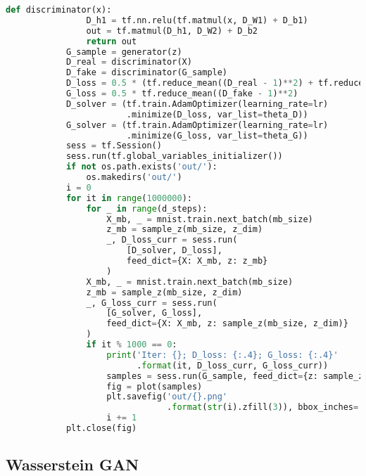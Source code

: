 \begin{lstlisting}[language = Python]
            def discriminator(x):
                D_h1 = tf.nn.relu(tf.matmul(x, D_W1) + D_b1)
                out = tf.matmul(D_h1, D_W2) + D_b2
                return out
            G_sample = generator(z)
            D_real = discriminator(X)
            D_fake = discriminator(G_sample)
            D_loss = 0.5 * (tf.reduce_mean((D_real - 1)**2) + tf.reduce_mean(D_fake**2))
            G_loss = 0.5 * tf.reduce_mean((D_fake - 1)**2)
            D_solver = (tf.train.AdamOptimizer(learning_rate=lr)
                        .minimize(D_loss, var_list=theta_D))
            G_solver = (tf.train.AdamOptimizer(learning_rate=lr)
                        .minimize(G_loss, var_list=theta_G))
            sess = tf.Session()
            sess.run(tf.global_variables_initializer())
            if not os.path.exists('out/'):
                os.makedirs('out/')
            i = 0
            for it in range(1000000):
                for _ in range(d_steps):
                    X_mb, _ = mnist.train.next_batch(mb_size)
                    z_mb = sample_z(mb_size, z_dim)
                    _, D_loss_curr = sess.run(
                        [D_solver, D_loss],
                        feed_dict={X: X_mb, z: z_mb}
                    )
                X_mb, _ = mnist.train.next_batch(mb_size)
                z_mb = sample_z(mb_size, z_dim)
                _, G_loss_curr = sess.run(
                    [G_solver, G_loss],
                    feed_dict={X: X_mb, z: sample_z(mb_size, z_dim)}
                )
                if it % 1000 == 0:
                    print('Iter: {}; D_loss: {:.4}; G_loss: {:.4}'
                          .format(it, D_loss_curr, G_loss_curr))
                    samples = sess.run(G_sample, feed_dict={z: sample_z(16, z_dim)})
                    fig = plot(samples)
                    plt.savefig('out/{}.png'
                                .format(str(i).zfill(3)), bbox_inches='tight')
                    i += 1
            plt.close(fig)
            \end{lstlisting}

    \subsection{Wasserstein GAN}
